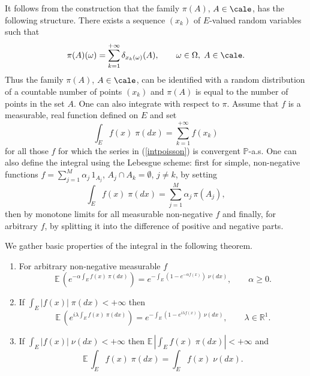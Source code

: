 \documentclass[preprint]{imsart}
\def\P{\mathbb P}
\def\E{\mathbb E}
\def\R{\mathbb R}
\begin{document}
{\noindent  It follows from the construction that the family
$\pi(A)$, $ A\in\cale$, has the following structure. There exists
a sequence $(x_k)$ of $E$-valued random variables such that
$$
\pi(A)(\omega) = \sum_{k=1}^{+\infty} \delta_{x_k(\omega)}(A),
\qquad \omega\in\Omega,\; A\in \cale.
$$
Thus the family $\pi(A)$, $ A\in\cale$,  can be identified with a
random distribution of a countable number of points $(x_k)$ and
$\pi(A)$ is equal to the number of  points in the set $A$.
One can also integrate with respect to $\pi$. Assume that $f$ is a
measurable, real function defined on $E$ and set
\begin{equation}\label{intpoisson}
\int_Ef(x)\; \pi (dx)= \sum_{k=1}^{+\infty} f(x_k)
\end{equation}
for all those $f$ for which the series in (\ref{intpoisson}) is
convergent $\P$-a.s. One can also define the integral using the
Lebesgue scheme: first for simple, non-negative functions
$f=\sum_{j=1}^M\alpha_j\, 1_{A_j}$, $A_j\cap A_k=\emptyset$,
$j\neq k$, by setting
$$
\int_Ef(x)\; \pi (dx)= \sum_{j=1}^M \alpha_j\, \pi(A_j),
$$
then by monotone limits for all measurable non-negative $f$
and finally, for arbitrary $f$,  by splitting it into the
difference of positive and negative parts.

\noindent We gather basic properties of  the integral in the following
theorem.


\begin{Theorem}\label{poissonintegral}
\begin{enumerate}\item[i)]
  For arbitrary non-negative measurable $f$
\begin{equation}\label{duestelle}
  \E\, \left( e^{-\alpha \int_Ef(x)\; \pi (dx)}\right)
  = e^{-\int_E(1-e^{-\alpha f(x)})\; \nu (dx)} ,
  \qquad \alpha\geq 0.
\end{equation}

\item[ii)] If $\int_E|f(x)|\; \pi (dx)<+\infty$ then
\begin{equation}\label{trestelle}
  \E\, \left( e^{i\lambda\int_Ef(x)\; \pi (dx)}\right)
  = e^{-\int_E(1-e^{i\lambda f(x)})\; \nu (dx)} ,
  \qquad \lambda\in\R^1.
\end{equation}

\item[iii)] If $\int_E|f(x)|\; \nu (dx)<+\infty$ then
$\E\, \left|\int_Ef(x)\; \pi (dx)\right|<+\infty$ and
$$
\E\, \int_Ef(x)\; \pi (dx)=
\int_Ef(x)\; \nu (dx).
$$



\end{enumerate}
\end{Theorem}}
\end{document}
